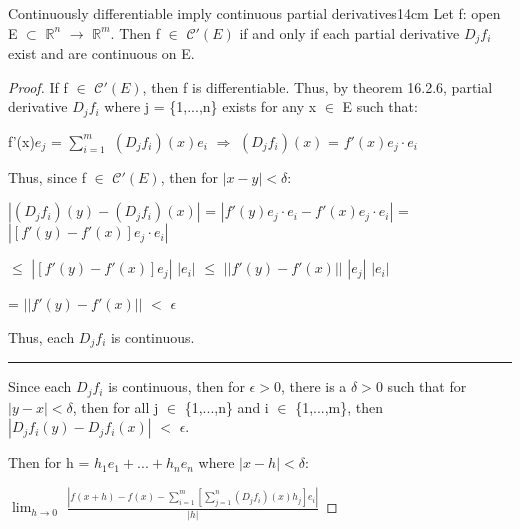     \vspace{0.5cm}



    \begin{wtheorem}
    {Continuously differentiable imply continuous partial derivatives}{14cm}
        Let f: open E $\subset$ $\mathbb{R}^n$ $\rightarrow$ $\mathbb{R}^m$.
        Then f $\in$ $\mathscr{C}'(E)$ if and only if
        each partial derivative $D_jf_i$ exist and are continuous on E.
    \end{wtheorem}

    \begin{proof}
        If f $\in$ $\mathscr{C}'(E)$, then f is differentiable.
        Thus, by {\color{red} theorem 16.2.6}, partial derivative $D_jf_i$
        where j = \{1,...,n\} exists for any x $\in$ E such that:

        \hspace{0.5cm}
        f'(x)$e_j$ = $\sum_{i=1}^m$ $(D_jf_i)(x)e_i$
        \hspace{1cm}
        $\Rightarrow$
        \hspace{1cm}
        $(D_jf_i)(x)$ = $f'(x)e_j \cdot e_i$

        Thus, since f $\in$ $\mathscr{C}'(E)$, then for $|x-y| < \delta$:

        \hspace{0.5cm}
        $|(D_jf_i)(y) - (D_jf_i)(x)|$
        = $|f'(y)e_j \cdot e_i - f'(x)e_j \cdot e_i|$
        = $|[f'(y) - f'(x)]e_j \cdot e_i|$

        \hspace{4.75cm}
        $\leq$ $|[f'(y) - f'(x)]e_j|$ $|e_i|$
        $\leq$ $||f'(y) - f'(x)||$ $|e_j|$ $|e_i|$

        \hspace{4.75cm}
        = $||f'(y) - f'(x)||$ $<$ $\epsilon$

        Thus, each $D_jf_i$ is continuous.

        \rule[0.1cm]{15.3cm}{0.01cm}

        Since each $D_jf_i$ is continuous, then for $\epsilon > 0$,
        there is a $\delta > 0$ such that for $|y-x| < \delta$, then
        for all j $\in$ \{1,...,n\} and i $\in$ \{1,...,m\}, then
        $|D_jf_i(y) - D_jf_i(x)|$ $<$ $\epsilon$.

        Then for h = $h_1e_1 + ... + h_ne_n$ where $|x-h| < \delta$:

        \hspace{0.5cm}
        $\lim_{h \rightarrow 0}$
        $\frac{|f(x+h) - f(x)
                - \sum_{i=1}^m [\sum_{j=1}^n (D_jf_i)(x)h_j]e_i|}{|h|}$


\end{proof}
